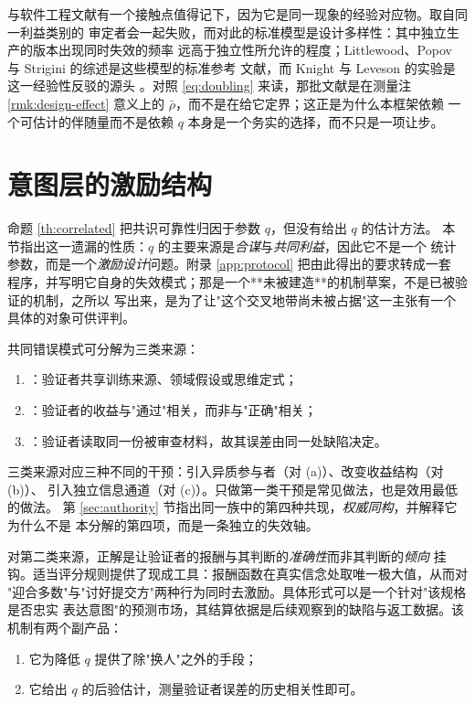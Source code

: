 与软件工程文献有一个接触点值得记下，因为它是同一现象的经验对应物。取自同一利益类别的
审定者会一起失败，而对此的标准模型是设计多样性：其中独立生产的版本出现同时失效的频率
远高于独立性所允许的程度；Littlewood、Popov 与 Strigini 的综述是这些模型的标准参考
文献，而 Knight 与 Leveson 的实验是这一经验性反驳的源头
\cite{littlewood2001,knight1986}。对照 \eqref{eq:doubling} 来读，那批文献是在测量注
\ref{rmk:design-effect} 意义上的 $\bar\rho$，而不是在给它定界；这正是为什么本框架依赖
一个可估计的伴随量而不是依赖 $q$ 本身是一个务实的选择，而不只是一项让步。

\section{意图层的激励结构}\label{sec:mechanism}

命题 \ref{th:correlated} 把共识可靠性归因于参数 $q$，但没有给出 $q$ 的估计方法。
本节指出这一遗漏的性质：$q$ 的主要来源是\emph{合谋}与\emph{共同利益}，因此它不是一个
统计参数，而是一个\emph{激励设计}问题。附录 \ref{app:protocol} 把由此得出的要求转成一套
程序，并写明它自身的失效模式；那是一个**未被建造**的机制草案，不是已被验证的机制，之所以
写出来，是为了让"这个交叉地带尚未被占据"这一主张有一个具体的对象可供评判。

\begin{principle}[$q$ 的构成]\label{pr:q-decomposition}
共同错误模式可分解为三类来源：
\begin{enumerate}[label=(\alph*)]
\item {}：验证者共享训练来源、领域假设或思维定式；
\item {}：验证者的收益与"通过"相关，而非与"正确"相关；
\item {}：验证者读取同一份被审查材料，故其误差由同一处缺陷决定。
\end{enumerate}
三类来源对应三种不同的干预：引入异质参与者（对 (a)）、改变收益结构（对 (b)）、
引入独立信息通道（对 (c)）。只做第一类干预是常见做法，也是效用最低的做法。
第 \ref{sec:authority} 节指出同一族中的第四种共现，\emph{权威同构}，并解释它为什么不是
本分解的第四项，而是一条独立的失效轴。
\end{principle}

\begin{principle}[适当评分规则]\label{pr:scoring}
对第二类来源，正解是让验证者的报酬与其判断的\emph{准确性}而非其判断的\emph{倾向}
挂钩。适当评分规则\cite{brier1950}提供了现成工具：报酬函数在真实信念处取唯一极大值，从而对
"迎合多数"与"讨好提交方"两种行为同时去激励。具体形式可以是一个针对"该规格是否忠实
表达意图"的预测市场，其结算依据是后续观察到的缺陷与返工数据。该机制有两个副产品：
\begin{enumerate}[label=(\alph*)]
\item 它为降低 $q$ 提供了除"换人"之外的手段；
\item 它给出 $q$ 的后验估计，测量验证者误差的历史相关性即可。
\end{enumerate}
\end{principle}

